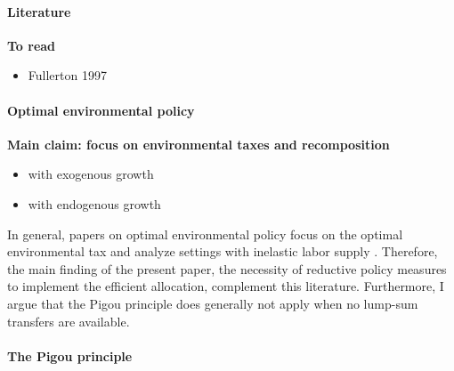 \paragraph{Literature}
\textbf{To read}
\begin{itemize}
	\item Fullerton 1997
\end{itemize}
\paragraph{Optimal environmental policy}
\textbf{Main claim: focus on environmental taxes and recomposition}
\begin{itemize}
	\item with exogenous growth
	\item with endogenous growth
\end{itemize}

In general, papers on optimal environmental policy focus on the optimal environmental tax and analyze settings with inelastic labor supply \citep{Golosov2014OptimalEquilibrium, Acemoglu2012TheChang, Fried2018ClimateAnalysis}. Therefore, the main finding of the present paper, the necessity of reductive policy measures to implement the efficient allocation, complement this literature. Furthermore, I argue that the Pigou principle does generally not apply when no lump-sum transfers are available.  

\paragraph{The Pigou principle }


